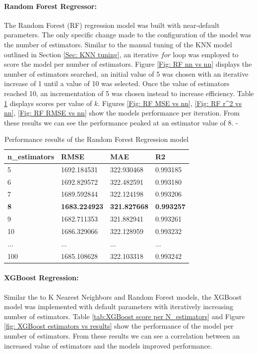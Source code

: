 \paragraph{Random Forest Regressor:}
The Random Forest (RF) regression model was built with near-default parameters. The only specific change made to the configuration of the model was the number of estimators. Similar to the manual tuning of the KNN model outlined in Section \ref{Sec: KNN tuning}, an iterative $for$ loop was employed to score the model per number of estimators. Figure \ref{Fig: RF nn vs nn} displays the number of estimators searched, an initial value of 5 was chosen with an iterative increase of 1 until a value of 10 was selected. Once the value of estimators reached 10, an incrementation of 5 was chosen instead to increase efficiency. Table \ref{tab: RF score per K} displays scores per value of $k$. Figures \ref{Fig: RF MSE vs nn}, \ref{Fig: RF r^2 vs nn}, \ref{Fig: RF RMSE vs nn} show the models performance per iteration. From these results we can see the performance peaked at an estimator value of 8.
-
\begin{table}[!htbp]
    \centering
    \begin{tabularx}{\textwidth}{XXXX}
    \hline
    n\_estimators & RMSE & MAE & R2 \\
    \hline
    5 & 1692.184531 & 322.930468 & 0.993185 \\
    6 & 1692.829572 & 322.482591 & 0.993180 \\
    7 & 1689.592844 & 322.124198 & 0.993206 \\
    \textbf{8} & \textbf{1683.224923} & \textbf{321.827668} & \textbf{0.993257} \\
    9 & 1682.711353 & 321.882941 & 0.993261 \\
    10 & 1686.329066 & 322.128959 & 0.993232 \\
    ... & ... & ... & ... \\
    100 & 1685.108628 & 322.103318 & 0.993242 \\
    \hline
    \end{tabularx}
    \caption{Performance results of the Random Forest Regression model}
    \label{tab: RF score per K}
\end{table}

\paragraph{XGBoost Regression:}
Similar the to K Nearest Neighbors and Random Forest models, the XGBoost model was implemented with default parameters with iteratively increasing number of estimators. Table \ref{tab:XGBoost score per N_estimators} and Figure \ref{fig: XGBoost estimators vs results} show the performance of the model per number of estimators. From these results we can see a correlation between an increased value of estimators and the models improved performance.


